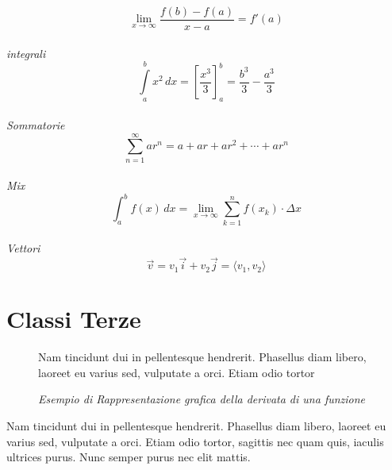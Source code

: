 \documentclass[11pt]{article}
\begin{document}


\begin{equation}
	\displaystyle{\lim \limits_{x \to \infty} \frac{f(b)-f(a)}{x-a}=f'(a)}
\end{equation}\\[1cm]
\emph{integrali}
\begin{equation}
	\displaystyle{\int \limits_{a}^{b}x^2 \,dx=\left[\frac{x^3}{3}\right]_{a}^{b}=\frac{b^3}{3}-\frac{a^3}{3}}
\end{equation}\\[1cm]
\emph{Sommatorie}
\begin{equation}
	\displaystyle{\sum \limits_{n=1}^{\infty}ar^n=a+ar+ar^2+\cdots+ar^n}
\end{equation}\\[1cm]
\emph{Mix}
\begin{equation}
	\displaystyle{\int_a^b{f(x) \,dx=\lim \limits_{x \to \infty} \sum \limits_{k=1}^{n}f(x_k) \cdot \Delta x}}
\end{equation}\\[1cm]
\emph{Vettori}
\begin{equation}
	\displaystyle{\vec{v}=v_1 \vec{i}+v_2 \vec{j}=\langle v_1, v_2 \rangle}
\end{equation}


\section{Classi Terze}
\begin{figure}[h!]
Nam tincidunt dui in pellentesque hendrerit. Phasellus diam libero, laoreet eu varius sed, vulputate a orci. Etiam odio tortor\\[5mm]
\caption {\textit{Esempio di Rappresentazione grafica della derivata di una funzione}}
\end{figure}
\noindent
Nam tincidunt dui in pellentesque hendrerit. Phasellus diam libero, laoreet eu varius sed, vulputate a orci. Etiam odio tortor, sagittis nec quam quis, iaculis ultrices purus. Nunc semper purus nec elit mattis.\\
\end{document}
